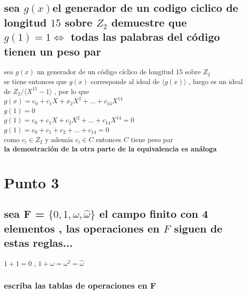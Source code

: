 \documentclass[10pt,a4paper]{article} %
\begin{document}
    \subsection{sea $g(x)$el generador de un codigo ciclico de longitud
    $15$ sobre $Z_2$ demuestre que $g(1) = 1 \iff $ todas las palabras
    del código tienen un peso par}
        sea $g(x)$ un generador de un código cíclico de longitud $15$ sobre $Z_2$
        \\
        se tiene entonces que $g(x)$ corresponde al ideal de $\langle g(x) \rangle
        $ , luego es un ideal de $ Z_2/\langle X ^{15}  -1 \rangle$ , por lo que
        \\
        $g(x) = c_0 + c_1X + x_2 X ^{2}  + ... + c_{14}X ^{14} $
        \\
        $g(1) = 0$
        \\
        $g(1) = c_0 + c_1X + c_2X ^{2}  + ... + c_{14} X ^{14} = 0 $
        \\
        $g(1) = c_0 + c_1 + c_2 + ... + c_{14} = 0 $
        \\
        como $c_i \in Z_2$  y además $c_i \in C $ entonces $C$ tiene peso par
        \\
        \textbf{la demostración de la otra parte de la equivalencia es análoga}

    \section{Punto 3}
    \subsection{sea F = $\{ 0 , 1 , \omega  , \hat{\omega }  \}$ el campo
    finito con 4 elementos , las operaciones en $F$ siguen de estas reglas...}
        $1+1 = 0$ , $1 + \omega  = \omega ^{2}  = \hat{\omega } $
        \subsubsection{escriba las tablas de operaciones en F}

\end{document}
